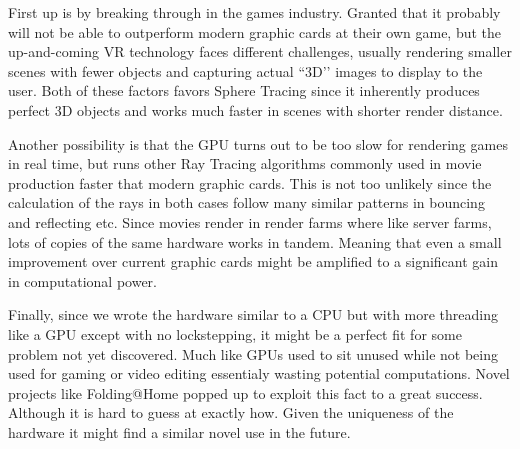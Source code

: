 		First up is by breaking through in the games industry. Granted that it
		probably will not be able to outperform modern graphic cards at their own
		game, but the up-and-coming VR technology faces different challenges,
		usually rendering smaller scenes with fewer objects and capturing actual
		``3D’’ images to display to the user. Both of these factors favors Sphere
		Tracing since it inherently produces perfect 3D objects and works much
		faster in scenes with shorter render distance.

		Another possibility is that the GPU turns out to be too slow for rendering
		games in real time, but runs other Ray Tracing algorithms commonly used in
		movie production faster that modern graphic cards. This is not too unlikely
		since the calculation of the rays in both cases follow many similar
		patterns in bouncing and reflecting etc. Since movies render in render
		farms where like server farms, lots of copies of the same hardware works in
		tandem. Meaning that even a small improvement over current graphic cards
		might be amplified to a significant gain in computational power.

		Finally, since we wrote the hardware similar to a CPU but with more
		threading like a GPU except with no lockstepping, it might be a perfect fit
		for some problem not yet discovered. Much like GPUs used to sit unused
		while not being used for gaming or video editing essentialy wasting
		potential computations. Novel projects like Folding@Home\cite{Beberg2009}
		popped up to exploit this fact to a great success. Although it is hard to
		guess at exactly how. Given the uniqueness of the hardware it might find a
		similar novel use in the future.
